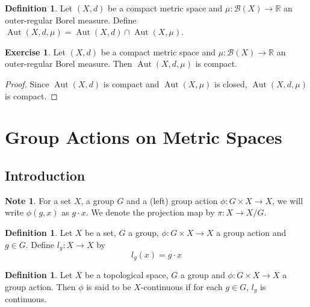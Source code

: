 \documentclass[12pt]{amsart}
\theoremstyle{definition}
\newtheorem{defn}[definition]{Definition}
\newtheorem{note}[definition]{Note}
\newtheorem{ex}[definition]{Exercise}
\newcommand{\R}{\mathbb{R}}
\newcommand{\MB}{\mathcal{B}}
\DeclareMathOperator{\Aut}{Aut}
\DeclareMathOperator*{\0}{\mbf{0}}
\DeclareMathOperator*{\1}{\mbf{1}}
\newcommand{\lex}[1]{\label{ex:#1}}
\newcommand{\ld}[1]{\label{defn:#1}}
\begin{document}
	\begin{defn} \ld{}
	Let $(X,d)$ be a compact metric space and $\mu: \MB(X) \rightarrow \R$ an outer-regular Borel measure. Define $\Aut(X, d, \mu) = \Aut(X, d) \cap \Aut(X, \mu)$.
	\end{defn}
	
	\begin{ex} \lex{}
	Let $(X,d)$ be a compact metric space and $\mu: \MB(X) \rightarrow \R$ an outer-regular Borel measure. Then $\Aut(X, d, \mu)$ is compact.
	\end{ex}
	
	\begin{proof}
	Since $\Aut(X, d)$ is compact and $\Aut(X, \mu)$ is closed, $\Aut(X, d, \mu)$ is compact.
	\end{proof}
	
	
	
	
	
	
	
	
	
	
	
	
	
	

	
	
	
	
	
	
	
	
	
	
	\newpage
	\section{Group Actions on Metric Spaces}
	
	\subsection{Introduction}
	\begin{note}
	For a set $X$, a group $G$ and a (left) group action $\phi: G \times X \rightarrow X$, we will write $\phi(g, x)$ as $g \cdot x$. We denote the projection map by $\pi: X \rightarrow X/G$.
	\end{note}	
	
	\begin{defn} \ld{00000} 
		Let $X$ be a set, $G$ a group, $\phi: G \times X \rightarrow X$ a group action and $g \in G$. Define $l_g:X \rightarrow X$ by 
		\begin{equation*}
		l_g(x) = g \cdot x
		\end{equation*}
	\end{defn}
	
	\begin{defn}
	Let $X$ be a topological space, $G$ a group and $\phi: G \times X \rightarrow X$ a group action. Then $\phi$ is said to be $X$-continuous if for each $g \in G$, $l_g$ is continuous.
	\end{defn}
	
\end{document}

